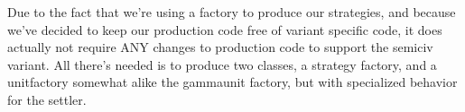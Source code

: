 Due to the fact that we're using a factory to produce our strategies, and
because we've decided to keep our production code free of variant specific code,
it does actually not require ANY changes to production code to support the
semiciv variant.
 All there's needed is to produce two classes, a strategy
factory, and a unitfactory somewhat alike the gammaunit factory, but
with specialized behavior for the settler.
